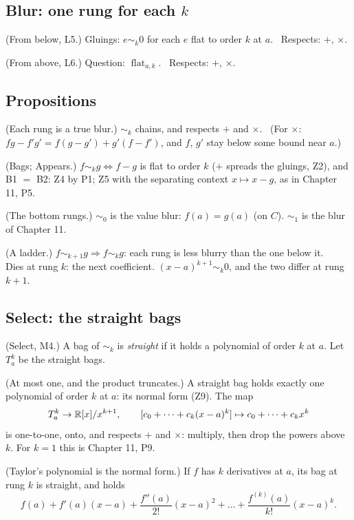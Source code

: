 \subsection*{Blur: one rung for each $k$}

\begin{lines}
\item[\lab{B1}] (From below, L5.) Gluings: $e \sim_k 0$ for each $e$ flat to order $k$ at $a$. \ Respects: $+$, $\times$.
\item[\lab{B2}] (From above, L6.) Question: $\operatorname{flat}_{a,k}$. \ Respects: $+$, $\times$.
\end{lines}

\subsection*{Propositions}

\begin{lines}
\item[\lab{P1}] (Each rung is a true blur.) $\sim_k$ chains, and respects $+$ and $\times$. \ (For $\times$: $f g - f' g' = f (g - g') + g' (f - f')$, and $f$, $g'$ stay below some bound near $a$.)
\item[\lab{P2}] (Bags; Appears.) $f \sim_k g \iff f - g$ is flat to order $k$ ($+$ spreads the gluings, Z2), and B1 $=$ B2: Z4 by P1; Z5 with the separating context $x \mapsto x - g$, as in Chapter 11, P5.
\item[\lab{P3}] (The bottom rungs.) $\sim_0$ is the value blur: $f(a) = g(a)$ (on $C$). $\sim_1$ is the blur of Chapter 11.
\item[\lab{P4}] (A ladder.) $f \sim_{k+1} g \Rightarrow f \sim_k g$: each rung is less blurry than the one below it. \\
Dies at rung $k$: the next coefficient. $(x - a)^{k+1} \sim_k 0$, and the two differ at rung $k + 1$.
\end{lines}

\subsection*{Select: the straight bags}

\begin{lines}
\item[\lab{D4}] (Select, M4.) A bag of $\sim_k$ is \emph{straight} if it holds a polynomial of order $k$ at $a$. Let $T^k_a$ be the straight bags.
\item[\lab{P5}] (At most one, and the product truncates.) A straight bag holds exactly one polynomial of order $k$ at $a$: its normal form (Z9). The map
\[
T^k_a \to \mathbb{R}[x]/x^{k+1}, \qquad [c_0 + \dots + c_k (x - a)^k] \mapsto c_0 + \dots + c_k x^k
\]
is one-to-one, onto, and respects $+$ and $\times$: multiply, then drop the powers above $k$. For $k = 1$ this is Chapter 11, P9.
\item[\lab{P6}] (Taylor's polynomial is the normal form.) If $f$ has $k$ derivatives at $a$, its bag at rung $k$ is straight, and holds
\[
f(a) + f'(a)(x - a) + \frac{f''(a)}{2!}(x - a)^2 + \dots + \frac{f^{(k)}(a)}{k!}(x - a)^k .
\]
\end{lines}

